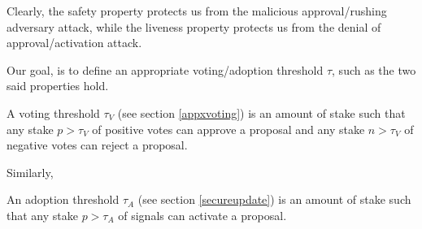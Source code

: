 Clearly, the safety property protects us from the malicious approval/rushing 
adversary attack, 
while the liveness property protects us from the denial of approval/activation 
attack.

Our goal, is to define an appropriate voting/adoption threshold $\tau$, such 
as the two said properties hold. 
\begin{definition}
	A voting threshold $\tau_V$ (see section \ref{appxvoting}) is an amount of 
	stake such that any stake $p 
	> \tau_V$ of positive votes can approve a proposal and any stake $n > 
	\tau_V$ of 	negative votes can reject a proposal.
\end{definition}
Similarly,
\begin{definition}
	An adoption threshold $\tau_A$ (see section \ref{secureupdate}) is 
	an amount of stake such that any stake $p 
	> \tau_A$ of signals can activate a proposal.
\end{definition}

%
%
%

